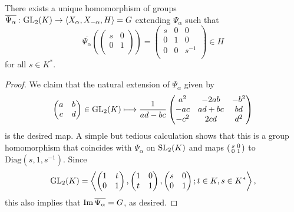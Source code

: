 \begin{theorem}
    There exists a unique homomorphism of groups $\overline{\Psi_\alpha}:\mathrm{GL}_2(K)\to\langle X_\alpha,X_{-\alpha},H\rangle=G$
    extending $\Psi_\alpha$ such that 
    $$\overline{\Psi_\alpha}\left(\begin{pmatrix}
        s & 0\\
        0 & 1\\
    \end{pmatrix}\right)=\begin{pmatrix}
        s & 0 & 0\\
        0 & 1 & 0\\
        0 & 0 & s^{-1}\\
    \end{pmatrix}\in H$$
    for all $s\in K^*$.
\end{theorem}
\begin{proof}
    We claim that the natural extension of $\Psi_\alpha$ given by 
    $$\begin{pmatrix}
        a & b\\
        c & d\\
    \end{pmatrix}\in\mathrm{GL}_2(K)\longmapsto\frac{1}{ad-bc}\begin{pmatrix}
        a^2 & -2ab & -b^2\\
        -ac & ad+bc & bd\\
        -c^2 & 2cd & d^2\\
    \end{pmatrix}$$
    is the desired map. A simple but tedious calculation shows that this is a group homomorphism that coincides with $\Psi_\alpha$ on $\mathrm{SL}_2(K)$ and maps $\begin{psmallmatrix}
        s & 0\\
        0 & 1\\
    \end{psmallmatrix}$
    to $\mathrm{Diag}(s,1,s^{-1})$. Since $$\mathrm{GL}_2(K)=\left\langle\begin{pmatrix}
        1 & t\\
        0 & 1\\
    \end{pmatrix},\begin{pmatrix}
        1 & 0\\
        t & 1\\
    \end{pmatrix}, \begin{pmatrix}
        s & 0\\
        0 & 1\\
    \end{pmatrix}; t\in K, s\in K^*\right\rangle,$$
    this also implies that $\operatorname{Im}\overline{\Psi_\alpha}=G$, as desired.
\end{proof}

